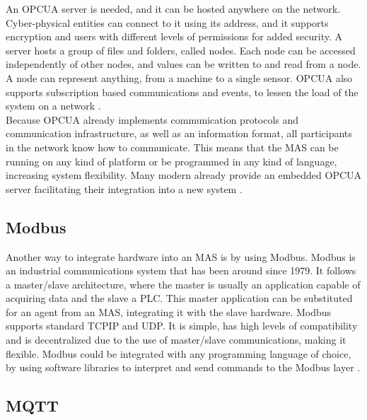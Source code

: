 An \acrshort{OPCUA} server is needed, and it can be hosted anywhere on the network. Cyber-physical entities can connect to it using its address, and it supports encryption and users with different levels of permissions for added security. A server hosts a group of files and folders, called nodes. Each node can be accessed independently of other nodes, and values can be written to and read from a node. A node can represent anything, from a machine to a single sensor. \acrshort{OPCUA} also supports subscription based communications and events, to lessen the load of the system on a network \cite{OPCUA_website}.\\

Because \acrshort{OPCUA} already implements communication protocols and communication infrastructure, as well as an information format, all participants in the network know how to communicate. This means that the \acrshort{MAS} can be running on any kind of platform or be programmed in any kind of language, increasing system flexibility. Many modern  already provide an embedded \acrshort{OPCUA} server facilitating their integration into a new system \cite{Seitz2021}.

\subsection{Modbus}

Another way to integrate hardware into an \acrshort{MAS} is by using Modbus. Modbus is an industrial communications system that has been around since 1979. It follows a master/slave architecture, where the master is usually an application capable of acquiring data and the slave a \acrshort{PLC}. This master application can be substituted for an agent from an \acrshort{MAS}, integrating it with the slave hardware. Modbus supports standard \acrshort{TCPIP} and \acrshort{UDP}. It is simple, has high levels of compatibility and is decentralized due to the use of master/slave communications, making it flexible. Modbus could be integrated with any programming language of choice, by using software libraries to interpret and send commands to the Modbus layer \cite{10084891}.

\subsection{MQTT}

